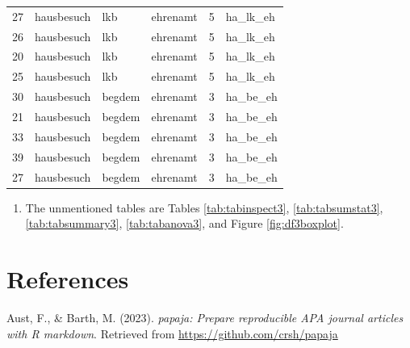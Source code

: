 \documentclass[
  doc,floatsintext]{apa6}
\providecommand{\tightlist}{%
  \setlength{\itemsep}{0pt}\setlength{\parskip}{0pt}}
\newlength{\cslhangindent}
\newlength{\cslentryspacingunit} %
\newenvironment{CSLReferences}[2] %
 {%
  \setlength{\parindent}{0pt}
  \ifodd #1
  \let\oldpar\par
  \def\par{\hangindent=\cslhangindent\oldpar}
  \fi
  \setlength{\parskip}{#2\cslentryspacingunit}
 }%
 {}
\begin{document}
\begin{table}[tbp]
\begin{center}
\begin{threeparttable}
\begin{tabular}{llllll}
27 & hausbesuch & lkb & ehrenamt & 5 & ha\_lk\_eh\\
26 & hausbesuch & lkb & ehrenamt & 5 & ha\_lk\_eh\\
20 & hausbesuch & lkb & ehrenamt & 5 & ha\_lk\_eh\\
25 & hausbesuch & lkb & ehrenamt & 5 & ha\_lk\_eh\\
30 & hausbesuch & begdem & ehrenamt & 3 & ha\_be\_eh\\
21 & hausbesuch & begdem & ehrenamt & 3 & ha\_be\_eh\\
33 & hausbesuch & begdem & ehrenamt & 3 & ha\_be\_eh\\
39 & hausbesuch & begdem & ehrenamt & 3 & ha\_be\_eh\\
27 & hausbesuch & begdem & ehrenamt & 3 & ha\_be\_eh\\
\bottomrule
\end{tabular}

\end{threeparttable}
\end{center}

\end{table}

\begin{enumerate}
\def\labelenumi{\arabic{enumi}.}
\setcounter{enumi}{2}
\tightlist
\item
  The unmentioned tables are Tables \ref{tab:tabinspect3}, \ref{tab:tabsumstat3}, \ref{tab:tabsummary3}, \ref{tab:tabanova3}, and Figure \ref{fig:df3boxplot}.
\end{enumerate}

\newpage

\hypertarget{references}{%
\section*{References}\label{references}}

\hypertarget{refs}{}
\begin{CSLReferences}{1}{0}
\leavevmode{}%
Aust, F., \& Barth, M. (2023). \emph{{papaja}: {Prepare} reproducible {APA} journal articles with {R} markdown}. Retrieved from \url{https://github.com/crsh/papaja}

\end{CSLReferences}


\clearpage
\renewcommand{\listfigurename}{Figure captions}

\clearpage
\renewcommand{\listtablename}{Table captions}
\end{document}
